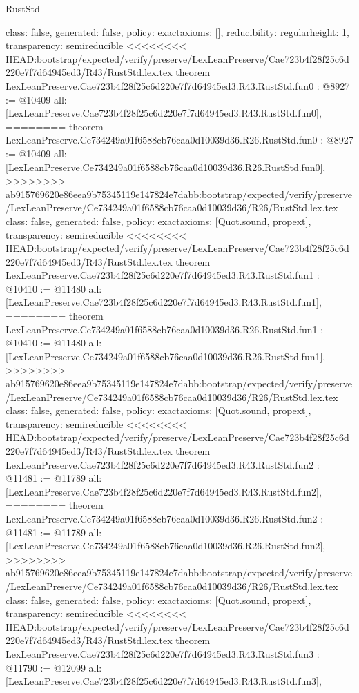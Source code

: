 \begin{lexlean}{RustStd}
\begin{coremodule}
{\begin{coremodule}
{{{  class: false,
  generated: false,
  policy: exact{axioms: []},
  reducibility: regular{height: 1},
  transparency: semireducible
}
<<<<<<<< HEAD:bootstrap/expected/verify/preserve/LexLeanPreserve/Cae723b4f28f25c6d220e7f7d64945ed3/R43/RustStd.lex.tex
theorem LexLeanPreserve.Cae723b4f28f25c6d220e7f7d64945ed3.R43.RustStd.fun0 : @8927 := @10409 {
  all: [LexLeanPreserve.Cae723b4f28f25c6d220e7f7d64945ed3.R43.RustStd.fun0],
========
theorem LexLeanPreserve.Ce734249a01f6588cb76caa0d10039d36.R26.RustStd.fun0 : @8927 := @10409 {
  all: [LexLeanPreserve.Ce734249a01f6588cb76caa0d10039d36.R26.RustStd.fun0],
>>>>>>>> ab915769620e86eea9b75345119e147824e7dabb:bootstrap/expected/verify/preserve/LexLeanPreserve/Ce734249a01f6588cb76caa0d10039d36/R26/RustStd.lex.tex
  class: false,
  generated: false,
  policy: exact{axioms: [Quot.sound, propext]},
  transparency: semireducible
}
<<<<<<<< HEAD:bootstrap/expected/verify/preserve/LexLeanPreserve/Cae723b4f28f25c6d220e7f7d64945ed3/R43/RustStd.lex.tex
theorem LexLeanPreserve.Cae723b4f28f25c6d220e7f7d64945ed3.R43.RustStd.fun1 : @10410 := @11480 {
  all: [LexLeanPreserve.Cae723b4f28f25c6d220e7f7d64945ed3.R43.RustStd.fun1],
========
theorem LexLeanPreserve.Ce734249a01f6588cb76caa0d10039d36.R26.RustStd.fun1 : @10410 := @11480 {
  all: [LexLeanPreserve.Ce734249a01f6588cb76caa0d10039d36.R26.RustStd.fun1],
>>>>>>>> ab915769620e86eea9b75345119e147824e7dabb:bootstrap/expected/verify/preserve/LexLeanPreserve/Ce734249a01f6588cb76caa0d10039d36/R26/RustStd.lex.tex
  class: false,
  generated: false,
  policy: exact{axioms: [Quot.sound, propext]},
  transparency: semireducible
}
<<<<<<<< HEAD:bootstrap/expected/verify/preserve/LexLeanPreserve/Cae723b4f28f25c6d220e7f7d64945ed3/R43/RustStd.lex.tex
theorem LexLeanPreserve.Cae723b4f28f25c6d220e7f7d64945ed3.R43.RustStd.fun2 : @11481 := @11789 {
  all: [LexLeanPreserve.Cae723b4f28f25c6d220e7f7d64945ed3.R43.RustStd.fun2],
========
theorem LexLeanPreserve.Ce734249a01f6588cb76caa0d10039d36.R26.RustStd.fun2 : @11481 := @11789 {
  all: [LexLeanPreserve.Ce734249a01f6588cb76caa0d10039d36.R26.RustStd.fun2],
>>>>>>>> ab915769620e86eea9b75345119e147824e7dabb:bootstrap/expected/verify/preserve/LexLeanPreserve/Ce734249a01f6588cb76caa0d10039d36/R26/RustStd.lex.tex
  class: false,
  generated: false,
  policy: exact{axioms: [Quot.sound, propext]},
  transparency: semireducible
}
<<<<<<<< HEAD:bootstrap/expected/verify/preserve/LexLeanPreserve/Cae723b4f28f25c6d220e7f7d64945ed3/R43/RustStd.lex.tex
theorem LexLeanPreserve.Cae723b4f28f25c6d220e7f7d64945ed3.R43.RustStd.fun3 : @11790 := @12099 {
  all: [LexLeanPreserve.Cae723b4f28f25c6d220e7f7d64945ed3.R43.RustStd.fun3],
}}}}}}
\end{coremodule}}
\end{coremodule}
\end{lexlean}
